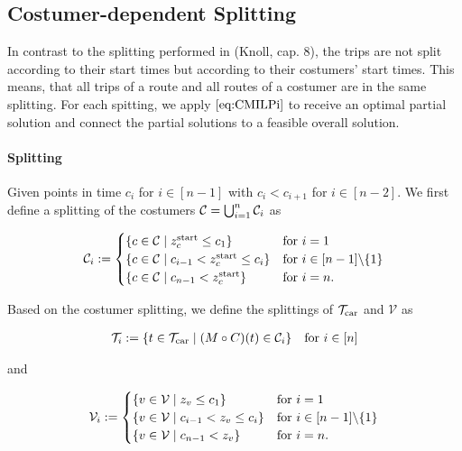 
\subsection{Costumer-dependent Splitting}

In contrast to the splitting performed in (Knoll, cap. 8), the trips are not split according to their start times but according to their costumers' start times. This means, that all trips of a route and all routes of a costumer are in the same splitting. For each spitting, we apply $\eqref{eq:CMILPi}$ to receive an optimal partial solution and connect the partial solutions to a feasible overall solution.

\paragraph{Splitting} \parfill

\begin{definition}
\label{def:costumer_dependent_splitting}

Given points in time $c_i$ for $i\in[n-1]$ with $c_i<c_{i+1}$ for $i\in[n-2]$. We first define a splitting of the costumers $\mathcal{C}=\bigcup_{i=1}^n\mathcal{C}_i$ as

\begin{align*}
	\mathcal{C}_i := \begin{cases}
		\left\{c\in\mathcal{C}\mid z^{\operatorname{start}}_c\leq c_1\right\} & \text{for } i=1 \\
		\left\{c\in\mathcal{C}\mid c_{i-1}<z^{\operatorname{start}}_c\leq c_i\right\} & \text{for } i\in[n-1]\backslash\{1\} \\
		\left\{c\in\mathcal{C}\mid c_{n-1}<z^{\operatorname{start}}_c\right\} & \text{for } i=n.
	\end{cases}
\end{align*}

Based on the costumer splitting, we define the splittings of $\mathcal{T}_{\operatorname{car}}$ and $\mathcal{V}$ as

\begin{align*}
	\mathcal{T}_i := \left\{t\in\mathcal{T}_{\operatorname{car}}\mid (M\circ C)(t)\in\mathcal{C}_i\right\} && \text{for } i\in[n]
\end{align*}

and

\begin{align*}
	\mathcal{V}_i := \begin{cases}
		\left\{v\in\mathcal{V}\mid z_v\leq c_1\right\} & \text{for } i=1 \\
		\left\{v\in\mathcal{V}\mid c_{i-1}<z_v\leq c_i\right\} & \text{for } i\in[n-1]\backslash\{1\} \\
		\left\{v\in\mathcal{V}\mid c_{n-1}<z_v\right\} & \text{for } i=n.
	\end{cases}
\end{align*}

\end{definition}

